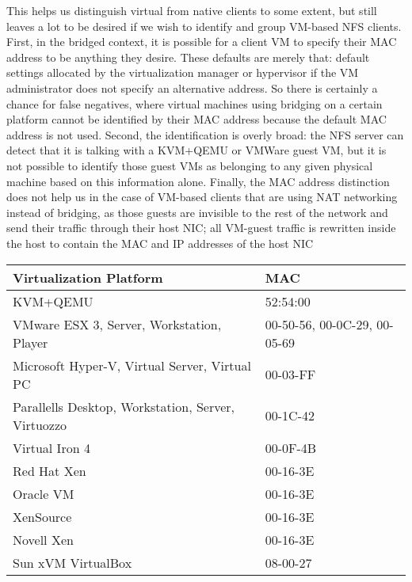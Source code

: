 \documentclass[11pt,pdftex,twocolumn]{article}
\begin{document}
This helps us distinguish virtual from native clients to some extent, but still leaves a lot to be desired if we wish to identify and group VM-based NFS clients. First, in the bridged context, it is possible for a client VM to specify their MAC address to be anything they desire. These defaults are merely that: default settings allocated by the virtualization manager or hypervisor if the VM administrator does not specify an alternative address. So there is certainly a chance for false negatives, where virtual machines using bridging on a certain platform cannot be identified by their MAC address because the default MAC address is not used. Second, the identification is overly broad: the NFS server can detect that it is talking with a KVM+QEMU or VMWare guest VM, but it is not possible to identify those guest VMs as belonging to any given physical machine based on this information alone. Finally, the MAC address distinction does not help us in the case of VM-based clients that are using NAT networking instead of bridging, as those guests are invisible to the rest of the network and send their traffic through their host NIC; all VM-guest traffic is rewritten inside the host to contain the MAC and IP addresses of the host NIC

\begin{center}
\begin{table*}[ht]
		\center
		\begin{tabular}{|l|l|}
		\hline
			Virtualization Platform & MAC \\
		\hline
		\hline
			KVM+QEMU & 52:54:00 \\
			VMware ESX 3, Server, Workstation, Player	& 00-50-56, 00-0C-29, 00-05-69 \\
			Microsoft Hyper-V, Virtual Server, Virtual PC	& 00-03-FF \\
			Parallells Desktop, Workstation, Server, Virtuozzo & 00-1C-42 \\
			Virtual Iron 4 & 00-0F-4B \\
			Red Hat Xen	& 00-16-3E \\
			Oracle VM	& 00-16-3E \\
			XenSource	& 00-16-3E \\
			Novell Xen & 00-16-3E \\
			Sun xVM VirtualBox & 08-00-27 \\
		\hline
		\end{tabular}
	\caption{First three octets of default MAC addresses by virtualization platform\footnote{ \emph{(Source:http://www.techrepublic.com/blog/networking/mac-address-scorecard-for-common-virtual-machine-platforms/538)}}}
	\label{tab:macaddrs}
\end{table*}
\end{center}
\end{document}

